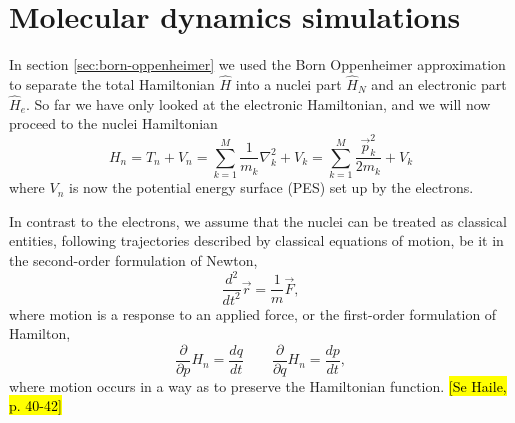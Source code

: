 \documentclass[11pt,bibliography=totoc,index=totoc]{scrbook}   %
\newcommand{\comment}[1]{\hl{#1}}
\begin{document}

%
\chapter{Molecular dynamics simulations}\label{cha:MD}
%

In section \ref{sec:born-oppenheimer} we used the Born Oppenheimer approximation to separate the total Hamiltonian $\hat{H}$ into a nuclei part $\hat{H}_N$ and an electronic part $\hat{H}_e$. 
So far we have only looked at the electronic Hamiltonian, and we will now proceed to the nuclei Hamiltonian
\begin{equation}
  H_n = T_n + V_n = \sum_{k=1}^M \frac{1}{m_k}\nabla_k^2 + V_k = \sum_{k=1}^M \frac{\vec{p}_k^2}{2m_k} + V_k
  \label{eq:nucleiHamiltonian}
\end{equation}
where $V_n$ is now the potential energy surface (PES) set up by the electrons.

In contrast to the electrons, we assume that the nuclei can be treated as classical entities, following trajectories described by 
classical equations of motion, be it in the
second-order formulation of Newton,
\begin{equation}
  \frac{d^2}{d t^2} \vec{r} = \frac{1}{m}\vec{F},
\end{equation}
where motion is a response to an applied force,
or the first-order formulation of Hamilton,
\begin{equation}
  \frac{\partial}{\partial p} H_n = \frac{dq}{dt} \qquad
  \frac{\partial}{\partial q} H_n = \frac{dp}{dt},
\end{equation}
where motion occurs in a way as to preserve the Hamiltonian function.
\comment{[Se Haile, p. 40-42]}
\end{document}
